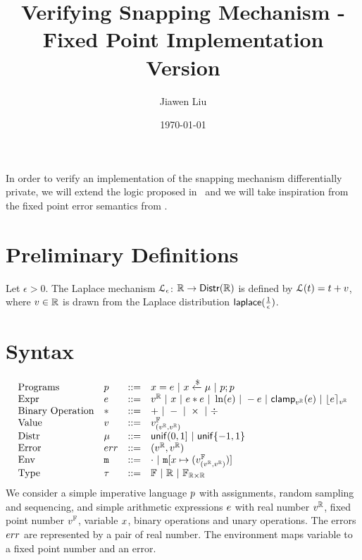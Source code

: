 \documentclass[a4paper,11pt]{article}
\begin{document}
\title{Verifying Snapping Mechanism - Fixed Point Implementation Version}
\author{Jiawen Liu}

\date{\today}

\maketitle
In order to verify an implementation of the snapping mechanism
\cite{mironov2012significance} differentially private, we will extend
the logic proposed in~\cite{barthe2016proving} and we will take
inspiration from the fixed
point error semantics from
\cite{Ramananandro2016unified,Martel2006higher,Becker2018verified,Moscato2017Automatic}.

\section{Preliminary Definitions}
\begin{defn}
Let $\epsilon > 0$. The Laplace mechanism  $\mathcal{L}_{\epsilon}$: $\mathbb{R} \to \mathsf{Distr}(\mathbb{R})$ is defined by $\mathcal{L}(t) = t + v$, where $v \in \mathbb{R}$ is drawn from the Laplace distribution $\mathsf{laplace}(\frac{1}{\epsilon})$.
\end{defn}
%
%
%

\section{Syntax}
\[\begin{array}{llll}
\mbox{Programs} & \prog & ::= &
    \varx = \expr ~|~ \varx \samplel \edistr
	~|~ \prog ; \prog  
	\\
%
\mbox{Expr} & \expr & ::= & \rval
	~|~ \varx  ~|~ \expr \bop \expr
	~|~ \ln (\expr) ~|~ - \expr ~|~ \clamp_{\rval}(\expr)
	~|~ \round{\expr}_{\rval}  \\
%
\mbox{Binary Operation} & \bop & ::= & + ~|~ - ~|~ \times ~|~ \div \\
%
%
%
\mbox{Value} & \valv & ::= & \fval_{(\rval, \rval)}\\
%
\mbox{Distr} & \edistr & ::= & \uniform(0, 1]
%
	~|~ \uniform\{-1, 1\}\\ 
%
\mbox{Error} & \err & ::= & (\rval, \rval) \\
%
\mbox{Env} & \trsmem & ::= & \cdot ~|~ \trsmem[x \mapsto (\fval_{(\rval, \rval)})]\\
%
\mbox{Type} & \tau & ::= & \float ~|~ \real ~|~ \float_{\real \times \real}
\end{array}
\]
%
We consider a simple imperative language $p$ with assignments, random sampling and sequencing, and simple arithmetic expressions $e$ with real number $v^{\mathbb{R}}$, fixed point number $v^{\mathbb{F}}$, variable $x$, binary operations and unary operations.
The errors $err$ are represented by a pair of real number. The environment maps variable to a fixed point number and an error.
%
%
%
\end{document}

